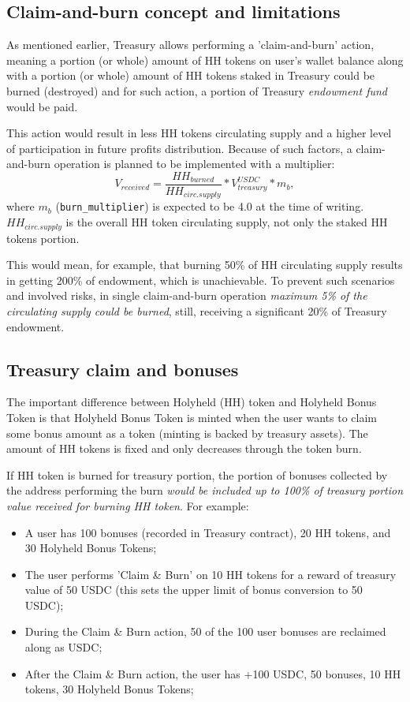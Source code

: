 \documentclass[12pt]{article}
\begin{document}
\subsection{Claim-and-burn concept and limitations}
\label{subsec:claim_and_burn}

As mentioned earlier, Treasury allows performing a 'claim-and-burn' action, meaning a portion (or whole) amount of HH tokens on user's wallet balance along with a portion (or whole) amount of HH tokens staked in Treasury could be burned (destroyed) and for such action, a portion of Treasury \emph{endowment fund} would be paid.

This action would result in less HH tokens circulating supply and a higher level of participation in future profits distribution. Because of such factors, a claim-and-burn operation is planned to be implemented with a multiplier:
\begin{equation}
	V_{\mathit{received}} = \frac{\mathit{HH}_{\mathit{burned}}}{\mathit{HH}_{\mathit{circ.supply}}} * V_{\mathit{treasury}}^{\mathit{USDC}} * m_{b},
\end{equation}
where $m_{b}$ (\texttt{burn\_multiplier}) is expected to be 4.0 at the time of writing. $\mathit{HH}_{\mathit{circ.supply}}$ is the overall HH token circulating supply, not only the staked HH tokens portion.

This would mean, for example, that burning 50\% of HH circulating supply results in getting 200\% of endowment, which is unachievable. To prevent such scenarios and involved risks, in single claim-and-burn operation \emph{maximum 5\% of the circulating supply could be burned}, still, receiving a significant 20\% of Treasury endowment.



\subsection{Treasury claim and bonuses}

The important difference between Holyheld (HH) token and Holyheld Bonus Token is that Holyheld Bonus Token is minted when the user wants to claim some bonus amount as a token (minting is backed by treasury assets). The amount of HH tokens is fixed and only decreases through the token burn.

If HH token is burned for treasury portion, the portion of bonuses collected by the address performing the burn  \emph{would be included up to 100\% of treasury portion value received for burning HH token}. For example:
\begin{itemize}
\item A user has 100 bonuses (recorded in Treasury contract), 20 HH tokens, and 30 Holyheld Bonus Tokens;
\item The user performs 'Claim \& Burn' on 10 HH tokens for a reward of treasury value of 50 USDC (this sets the upper limit of bonus conversion to 50 USDC);
\item During the Claim \& Burn action, 50 of the 100 user bonuses are reclaimed along as USDC;
\item After the Claim \& Burn action, the user has +100 USDC, 50 bonuses, 10 HH tokens, 30 Holyheld Bonus Tokens;
\end{itemize}
\end{document}
